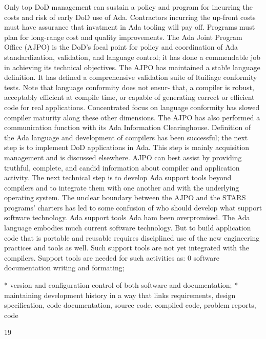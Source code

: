 \documentclass[12pt]{article}
\begin{document}
Only top DoD management can sustain a policy and program for incurring
the costs and risk of early DoD use of Ada.
Contractors incurring the up-front costs must have assurance that invatment in Ada
tooling will pay off. Programs must plan for long-range cost and quality improvements.
The Ada Joint Program Office (AJPO) is the DoD's focal point for policy
and coordination of Ada standardization, validation, and language control; it
has done a commendable job in achieving its technical objectives.
The AJPO has maintained a stab!e language definition. It has defined a comprehensive
validation suite of ltuiliage conformity tests. Note that language conformity does not
ensur- that, a compiler is robust, acceptably efficient at compile time, or capable of
generating correct or efficient code for real applications. Concentrated focus on language
conformity has slowed compiler maturity along these other dimensions. The AJPO has
also performed a communication function with its Ada Information Clearinghouse.
Definition of the Ada language and development of compilers has been
successful; the next step is to implement DoD applications in Ada.
This step is mainly acquisition management and is discussed elsewhere. AJPO can
best assist by providing truthful, complete, and candid information about compiler and
application activity.
The next technical step is to develop Ada support tools beyond compilers
and to integrate them with one another and with the underlying operating
system.
The unclear boundary between the AJPO and the STARS programs' charters has led
to some confusion of who should develop what support software technology.
Ada support tools
Ada ham been overpromised.
The Ada language embodies much current software technology. But to build application code that is portable and reusable requires disciplined use of the new engineering
practices and tools as well. Such support tools are not yet integrated with the compilers.
Support tools are needed for such activities as:
0 software documentation writing and formating;

* version and configuration control of both software and documentation;
* maintaining development history in a way that links requirements, design specification, code documentation, source code, compiled code, problem reports, code

19
\end{document}
